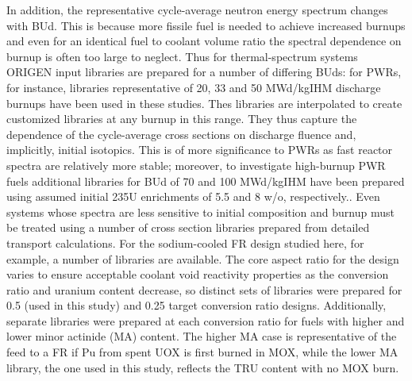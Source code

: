 In addition, the representative cycle-average neutron energy spectrum changes with BUd.  This is because more fissile fuel is needed to achieve increased burnups and even for an identical fuel to coolant volume ratio the spectral dependence on burnup is often too large to neglect.  Thus for thermal-spectrum systems ORIGEN input libraries are prepared for a number of differing BUds: for PWRs, for instance, libraries representative of 20, 33 and 50 MWd/kgIHM discharge burnups have been used in these studies.  Thes libraries are interpolated to create customized libraries at any burnup in this range.  They thus capture the dependence of the cycle-average cross sections on discharge fluence and, implicitly, initial isotopics.  This is of more significance to PWRs as fast reactor spectra are relatively more stable; moreover, to investigate high-burnup PWR fuels additional libraries for BUd of 70 and 100 MWd/kgIHM have been prepared using assumed initial 235U enrichments of 5.5 and 8 w/o, respectively..
Even systems whose spectra are less sensitive to initial composition and burnup must be treated using a number of cross section libraries prepared from detailed transport calculations.  For the sodium-cooled FR design studied here, for example, a number of libraries are available.  The core aspect ratio for the design varies to ensure acceptable coolant void reactivity properties as the conversion ratio and uranium content decrease, so distinct sets of libraries were prepared for 0.5 (used in this study) and 0.25 target conversion ratio designs.  Additionally, separate libraries were prepared at each conversion ratio for fuels with higher and lower minor actinide (MA) content.   The higher MA case is representative of the feed to a FR if Pu from spent UOX is first burned in MOX, while the lower MA library, the one used in this study, reflects the TRU content with no MOX burn.



